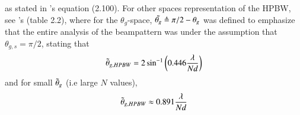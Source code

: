 as stated in \cite{VanTrees2002DetectionIV}'s equation (2.100). For other spaces representation of the HPBW, see \cite{VanTrees2002DetectionIV}'s (table 2.2), where for the $\theta_{g}$-space, $\Tilde{\theta_{g}} \triangleq \pi/2-\theta_{g}$ was defined to emphasize that the entire analysis of the beampattern was under the assumption that $\theta_{g,s}=\pi/2$, stating that
\begin{equation}
    \Tilde{\theta}_{g,HPBW} = 2\sin^{-1}\left(0.446\frac{\lambda}{Nd}\right)
\end{equation}
and for small $\Tilde{\theta}_{g}$ (i.e large $N$ values),
\begin{equation}
    \Tilde{\theta}_{g,HPBW} \approx 0.891\frac{\lambda}{Nd}
\end{equation}